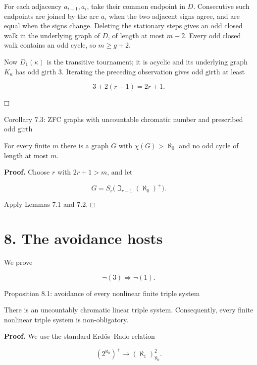 \documentclass[11pt]{article}
\providecommand{\square}{\mdlgwhtsquare}
\begin{document}
For each adjacency \(a_{i-1},a_i\), take their common endpoint in \(D\). Consecutive such endpoints are joined by the arc \(a_i\) when the two adjacent signs agree, and are equal when the signs change. Deleting the stationary steps gives an odd closed walk in the underlying graph of \(D\), of length at most \(m-2\). Every odd closed walk contains an odd cycle, so \(m\ge g+2\).

Now \(D_1(\kappa)\) is the transitive tournament; it is acyclic and its underlying graph \(K_\kappa\) has odd girth \(3\). Iterating the preceding observation gives odd girth at least

\[
3+2(r-1)=2r+1.
\]

\(\square\)

\label{corollary-7.3-zfc-graphs-with-uncountable-chromatic-number-and-prescribed-odd-girth}
\begin{corollarybox}{Corollary 7.3: ZFC graphs with uncountable chromatic number and prescribed odd girth}

For every finite \(m\) there is a graph \(G\) with \(\chi(G)>\aleph_0\) and no odd cycle of length at most \(m\).

\end{corollarybox}
\textbf{Proof.} Choose \(r\) with \(2r+1>m\), and let

\[
G=S_r\bigl(\beth_{r-1}(\aleph_0)^+\bigr).
\]

Apply Lemmas 7.1 and 7.2. \(\square\)

\section{8. The avoidance hosts}\label{the-avoidance-hosts}

We prove

\[
\neg(3)\Longrightarrow\neg(1).
\]

\label{proposition-8.1-avoidance-of-every-nonlinear-finite-triple-system}
\begin{propositionbox}{Proposition 8.1: avoidance of every nonlinear finite triple system}

There is an uncountably chromatic linear triple system. Consequently, every finite nonlinear triple system is non-obligatory.

\end{propositionbox}
\textbf{Proof.} We use the standard Erdős--Rado relation

\[
(2^{\aleph_0})^+\longrightarrow(\aleph_1)^2_{\aleph_0}. \tag{8.1}
\]
\end{document}
